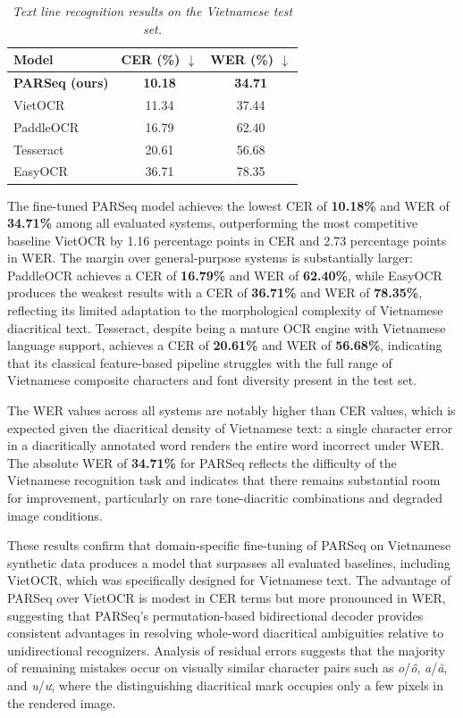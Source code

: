 \begin{table}[H]
\centering
\small
\caption[Text line recognition results on the Vietnamese test set]{\textit{Text line recognition results on the Vietnamese test set.}}
\label{tab:recognition_results}
\begin{tabular}{lcc}
\hline
\textbf{Model} & \textbf{CER (\%)} $\downarrow$ & \textbf{WER (\%)} $\downarrow$ \\
\hline
\textbf{PARSeq (ours)} & \textbf{10.18} & \textbf{34.71} \\
VietOCR & 11.34 & 37.44 \\
PaddleOCR & 16.79 & 62.40 \\
Tesseract & 20.61 & 56.68 \\
EasyOCR & 36.71 & 78.35 \\
\hline
\end{tabular}
\end{table}

The fine-tuned PARSeq model achieves the lowest CER of \textbf{10.18\%} and WER of \textbf{34.71\%} among all evaluated systems, outperforming the most competitive baseline VietOCR by 1.16 percentage points in CER and 2.73 percentage points in WER. The margin over general-purpose systems is substantially larger: PaddleOCR achieves a CER of \textbf{16.79\%} and WER of \textbf{62.40\%}, while EasyOCR produces the weakest results with a CER of \textbf{36.71\%} and WER of \textbf{78.35\%}, reflecting its limited adaptation to the morphological complexity of Vietnamese diacritical text. Tesseract, despite being a mature OCR engine with Vietnamese language support, achieves a CER of \textbf{20.61\%} and WER of \textbf{56.68\%}, indicating that its classical feature-based pipeline struggles with the full range of Vietnamese composite characters and font diversity present in the test set.

The WER values across all systems are notably higher than CER values, which is expected given the diacritical density of Vietnamese text: a single character error in a diacritically annotated word renders the entire word incorrect under WER. The absolute WER of \textbf{34.71\%} for PARSeq reflects the difficulty of the Vietnamese recognition task and indicates that there remains substantial room for improvement, particularly on rare tone-diacritic combinations and degraded image conditions.

These results confirm that domain-specific fine-tuning of PARSeq on Vietnamese synthetic data produces a model that surpasses all evaluated baselines, including VietOCR, which was specifically designed for Vietnamese text. The advantage of PARSeq over VietOCR is modest in CER terms but more pronounced in WER, suggesting that PARSeq's permutation-based bidirectional decoder provides consistent advantages in resolving whole-word diacritical ambiguities relative to unidirectional recognizers. Analysis of residual errors suggests that the majority of remaining mistakes occur on visually similar character pairs such as \textit{o}/\textit{ô}, \textit{a}/\textit{ă}, and \textit{u}/\textit{ư}, where the distinguishing diacritical mark occupies only a few pixels in the rendered image.

